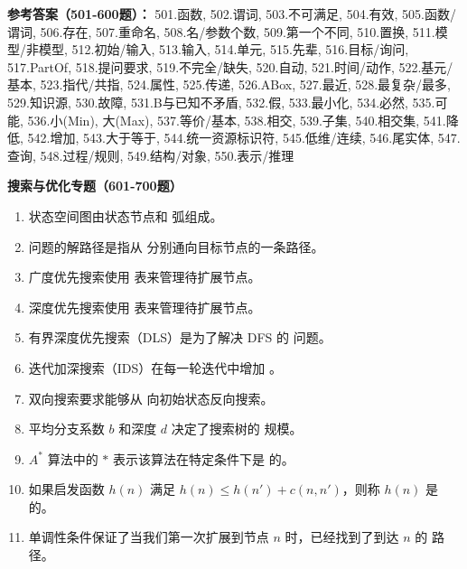 \textbf{参考答案（501-600题）：}
501.函数, 502.谓词, 503.不可满足, 504.有效, 505.函数/谓词, 506.存在, 507.重命名, 508.名/参数个数, 509.第一个不同, 510.置换, 511.模型/非模型, 512.初始/输入, 513.输入, 514.单元, 515.先辈, 516.目标/询问, 517.PartOf, 518.提问要求, 519.不完全/缺失, 520.自动, 521.时间/动作, 522.基元/基本, 523.指代/共指, 524.属性, 525.传递, 526.ABox, 527.最近, 528.最复杂/最多, 529.知识源, 530.故障, 531.B与已知不矛盾, 532.假, 533.最小化, 534.必然, 535.可能, 536.小(Min), 大(Max), 537.等价/基本, 538.相交, 539.子集, 540.相交集, 541.降低, 542.增加, 543.大于等于, 544.统一资源标识符, 545.低维/连续, 546.尾实体, 547.查询, 548.过程/规则, 549.结构/对象, 550.表示/推理

\vspace{1em}
\textbf{搜索与优化专题（601-700题）}
\begin{enumerate}[resume,leftmargin=2em,itemsep=1pt]
\item 状态空间图由状态节点和 \underline{\hspace{3em}} 弧组成。
\item 问题的解路径是指从 \underline{\hspace{3em}} 分别通向目标节点的一条路径。
\item 广度优先搜索使用 \underline{\hspace{3em}} 表来管理待扩展节点。
\item 深度优先搜索使用 \underline{\hspace{3em}} 表来管理待扩展节点。
\item 有界深度优先搜索（DLS）是为了解决 DFS 的 \underline{\hspace{3em}} 问题。
\item 迭代加深搜索（IDS）在每一轮迭代中增加 \underline{\hspace{3em}}。
\item 双向搜索要求能够从 \underline{\hspace{3em}} 向初始状态反向搜索。
\item 平均分支系数 $b$ 和深度 $d$ 决定了搜索树的 \underline{\hspace{3em}} 规模。
\item $A^*$ 算法中的 $*$ 表示该算法在特定条件下是 \underline{\hspace{3em}} 的。
\item 如果启发函数 $h(n)$ 满足 $h(n) \le h(n') + c(n, n')$，则称 $h(n)$ 是 \underline{\hspace{3em}} 的。
\item 单调性条件保证了当我们第一次扩展到节点 $n$ 时，已经找到了到达 $n$ 的 \underline{\hspace{3em}} 路径。

\end{enumerate}
